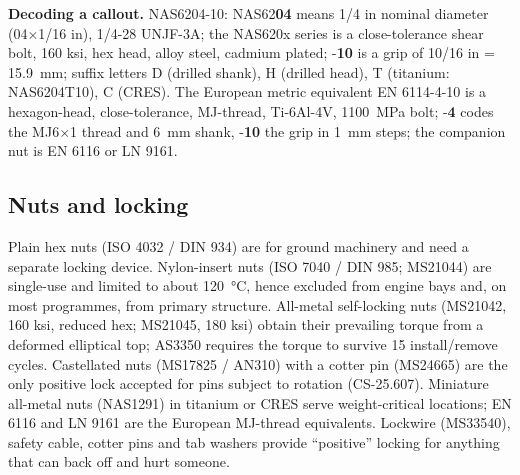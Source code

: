 \documentclass[11pt,a4paper]{article}
\begin{document}
\textbf{Decoding a callout.} NAS6204-10: NAS62\textbf{04} means 1/4 in nominal diameter (04$\times$1/16 in), 1/4-28 UNJF-3A; the NAS620x series is a close-tolerance shear bolt, 160 ksi, hex head, alloy steel, cadmium plated; -\textbf{10} is a grip of 10/16 in = \SI{15.9}{mm}; suffix letters D (drilled shank), H (drilled head), T (titanium: NAS6204T10), C (CRES). The European metric equivalent EN 6114-4-10 is a hexagon-head, close-tolerance, MJ-thread, Ti-6Al-4V, \SI{1100}{MPa} bolt; -\textbf{4} codes the MJ6$\times$1 thread and \SI{6}{mm} shank, -\textbf{10} the grip in \SI{1}{mm} steps; the companion nut is EN 6116 or LN 9161.

\subsection{Nuts and locking}
Plain hex nuts (ISO 4032 / DIN 934) are for ground machinery and need a separate locking device. Nylon-insert nuts (ISO 7040 / DIN 985; MS21044) are single-use and limited to about \SI{120}{\celsius}, hence excluded from engine bays and, on most programmes, from primary structure. All-metal self-locking nuts (MS21042, 160 ksi, reduced hex; MS21045, 180 ksi) obtain their prevailing torque from a deformed elliptical top; AS3350 requires the torque to survive 15 install/remove cycles. Castellated nuts (MS17825 / AN310) with a cotter pin (MS24665) are the only positive lock accepted for pins subject to rotation (CS-25.607). Miniature all-metal nuts (NAS1291) in titanium or CRES serve weight-critical locations; EN 6116 and LN 9161 are the European MJ-thread equivalents. Lockwire (MS33540), safety cable, cotter pins and tab washers provide ``positive'' locking for anything that can back off and hurt someone.
\end{document}
